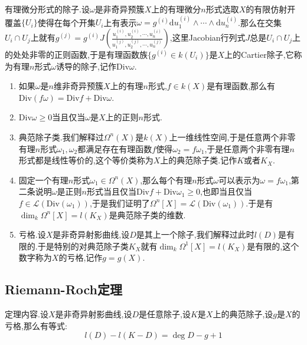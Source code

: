 有理微分形式的除子.设$\omega$是非奇异预簇$X$上的有理微分$n$形式选取$X$的有限仿射开覆盖$\{U_i\}$使得在每个开集$U_i$上有表示$\omega=g^{(i)}\mathrm{d}u_1^{(i)}\wedge\cdots\wedge\mathrm{d}u_n^{(i)}$.那么在交集$U_i\cap U_j$上就有$g^{(j)}=g^{(i)}J\left(\frac{u_1^{(i)},u_2^{(i)},\cdots,u_n^{(i)}}{u_1^{(j)},u_2^{(j)},\cdots,u_n^{(j)}}\right)$,这里Jacobian行列式$J$总是$U_i\cap U_j$上的处处非零的正则函数,于是有理函数族$\{g^{(i)}\in k(U_i)\}$是$X$上的Cartier除子,它称为有理$n$形式$\omega$诱导的除子,记作$\mathrm{Div}\omega$.
\begin{enumerate}
	\item 如果$\omega$是$n$维非奇异预簇$X$上的有理$n$形式,$f\in k(X)$是有理函数,那么有$\mathrm{Div}(f\omega)=\mathrm{Div}f+\mathrm{Div}\omega$.
	\item $\mathrm{Div}\omega\ge0$当且仅当$\omega$是$X$上的正则$n$形式.
	\item 典范除子类.我们解释过$\Omega^n(X)$是$k(X)$上一维线性空间,于是任意两个非零有理$n$形式$\omega_1,\omega_2$都满足存在有理函数$f$使得$\omega_2=f\omega_1$,于是任意两个非零有理$n$形式都是线性等价的,这个等价类称为$X$上的典范除子类.记作$K$或者$K_X$.
	\item 固定一个有理$n$形式$\omega_1\in\Omega^n(X)$,那么每个有理$n$形式$\omega$可以表示为$\omega=f\omega_1$,第二条说明$\omega$是正则$n$形式当且仅当$\mathrm{Div}f+\mathrm{Div}\omega_1\ge0$,也即当且仅当$f\in\mathscr{L}(\mathrm{Div}(\omega_1))$,于是我们证明了$\Omega^n[X]=\mathscr{L}(\mathrm{Div}(\omega_1))$.于是有$\dim_k\Omega^n[X]=l(K_X)$是典范除子类的维数.
	\item 亏格.设$X$是非奇异射影曲线,设$D$是其上一个除子,我们解释过此时$l(D)$是有限的.于是特别的对典范除子类$K_X$就有$\dim_k\Omega^1[X]=l(K_X)$是有限的,这个数字称为$X$的亏格,记作$g=g(X)$.
\end{enumerate}



\newpage
\subsection{Riemann-Roch定理}

定理内容.设$X$是非奇异射影曲线,设$D$是任意除子,设$K$是$X$上的典范除子,设$g$是$X$的亏格,那么有等式:$$l(D)-l(K-D)=\deg D-g+1$$

